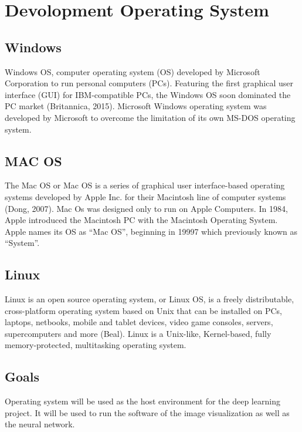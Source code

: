 \documentclass{scrreprt}
\begin{document}
\section{Devolopment Operating System}

\subsection{Windows}
Windows OS, computer operating system (OS) developed by Microsoft Corporation to run personal
computers (PCs). Featuring the first graphical user interface (GUI) for IBM-compatible PCs, the Windows
OS soon dominated the PC market (Britannica, 2015). Microsoft Windows operating system was
developed by Microsoft to overcome the limitation of its own MS-DOS operating system.

\subsection{MAC OS}
The Mac OS or Mac OS is a series of graphical user interface-based operating systems developed by
Apple Inc. for their Macintosh line of computer systems (Dong, 2007). Mac Os was designed only to run
on Apple Computers. In 1984, Apple introduced the Macintosh PC with the Macintosh Operating
System. Apple names its OS as “Mac OS”, beginning in 19997 which previously known as “System”.

\subsection{Linux}
Linux is an open source operating system, or Linux OS, is a freely distributable, cross-platform operating
system based on Unix that can be installed on PCs, laptops, netbooks, mobile and tablet devices, video
game consoles, servers, supercomputers and more (Beal). Linux is a Unix-like, Kernel-based, fully
memory-protected, multitasking operating system.

\subsection{Goals}
Operating system will be used as the host environment for the deep learning project.
It will be used to run the software of the image visualization as well as the neural network.
\end{document}
